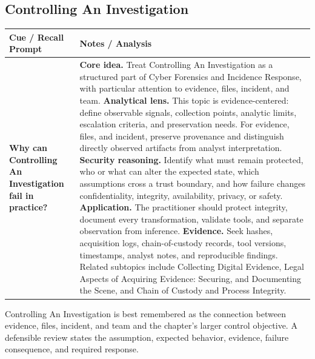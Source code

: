 \documentclass[11pt]{article}
\newcommand{\CornellHeader}{%
\rowcolor{Navy}\color{white}\bfseries Cue / Recall Prompt & \color{white}\bfseries Notes / Analysis\\\hline}
\newcommand{\CornellRow}[2]{%
\cellcolor{CueGray}\RaggedRight\textbf{#1} & \RaggedRight #2\\\hline}
\begin{document}
\subsection*{Controlling An Investigation}
\begin{longtable}{>{\RaggedRight\arraybackslash}p{}|>{\RaggedRight\arraybackslash}p{}}
\CornellHeader
\CornellRow{Why can Controlling An Investigation fail in practice?}{\textbf{Core idea.} Treat Controlling An Investigation as a structured part of Cyber Forensics and Incidence Response, with particular attention to evidence, files, incident, and team. \textbf{Analytical lens.} This topic is evidence-centered: define observable signals, collection points, analytic limits, escalation criteria, and preservation needs. For evidence, files, and incident, preserve provenance and distinguish directly observed artifacts from analyst interpretation. \textbf{Security reasoning.} Identify what must remain protected, who or what can alter the expected state, which assumptions cross a trust boundary, and how failure changes confidentiality, integrity, availability, privacy, or safety. \textbf{Application.} The practitioner should protect integrity, document every transformation, validate tools, and separate observation from inference. \textbf{Evidence.} Seek hashes, acquisition logs, chain-of-custody records, tool versions, timestamps, analyst notes, and reproducible findings. Related subtopics include Collecting Digital Evidence, Legal Aspects of Acquiring Evidence: Securing, and Documenting the Scene, and Chain of Custody and Process Integrity.}
\end{longtable}
\begin{topicsummary}
Controlling An Investigation is best remembered as the connection between evidence, files, incident, and team and the chapter's larger control objective. A defensible review states the assumption, expected behavior, evidence, failure consequence, and required response.
\end{topicsummary}
\end{document}
